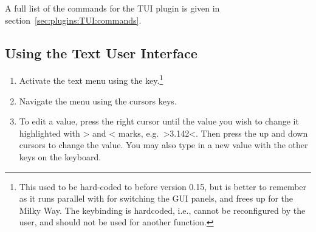 A full list of the commands for the TUI plugin is
given in section~\ref{sec:plugins:TUI:commands}. 

\subsection{Using the Text User Interface}
\label{sec:plugins:TUI:using}

\begin{enumerate}
\item Activate the text menu using the  key.\footnote{This
    used to be hard-coded to  before version 0.15, but
     is better to remember as it runs parallel with
     for switching the GUI panels, and frees up 
    for the Milky Way. The  keybinding is hardcoded, i.e.,
    cannot be reconfigured by the user, and should not be used for
    another function.}
\item
  Navigate the menu using the cursors keys.
\item
  To edit a value, press the right cursor until the value you wish to
  change it highlighted with \textgreater{} and \textless{} marks, e.g.\
  \textgreater{}3.142\textless{}. Then press the up and down cursors to
  change the value. You may also type in a new value with the other keys
  on the keyboard.
\end{enumerate}


